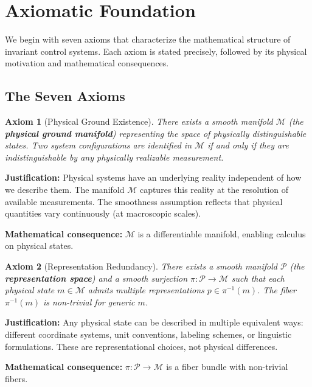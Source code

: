 \documentclass[11pt]{article}
\newtheorem{axiom}{Axiom}
\begin{document}
\section{Axiomatic Foundation}

We begin with seven axioms that characterize the mathematical structure of invariant control
systems. Each axiom is stated precisely, followed by its physical motivation and mathematical
consequences.

\subsection{The Seven Axioms}

\begin{axiom}[Physical Ground Existence]
There exists a smooth manifold $\mathcal{M}$ (the \textbf{physical
ground manifold}) representing the space of physically distinguishable states. Two system
configurations are identified in $\mathcal{M}$ if and only if they are indistinguishable by any physically
realizable measurement.
\end{axiom}

\textbf{Justification:} Physical systems have an underlying reality independent of how we describe them. The manifold $\mathcal{M}$ captures this reality at the resolution of available measurements.
The smoothness assumption reflects that physical quantities vary continuously (at macroscopic
scales).

\textbf{Mathematical consequence:} $\mathcal{M}$ is a differentiable manifold, enabling calculus on physical
states.

\begin{axiom}[Representation Redundancy]
There exists a smooth manifold $\mathcal{P}$ (the \textbf{representation space}) and a smooth surjection $\pi : \mathcal{P} \to \mathcal{M}$ such that each physical state $m \in \mathcal{M}$ admits
multiple representations $p \in \pi^{-1}(m)$. The fiber $\pi^{-1}(m)$ is non-trivial for generic $m$.
\end{axiom}

\textbf{Justification:} Any physical state can be described in multiple equivalent ways: different
coordinate systems, unit conventions, labeling schemes, or linguistic formulations. These are
representational choices, not physical differences.

\textbf{Mathematical consequence:} $\pi : \mathcal{P} \to \mathcal{M}$ is a fiber bundle with non-trivial fibers.
\end{document}
